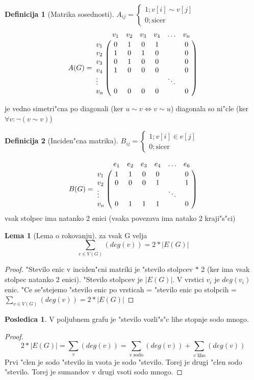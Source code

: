 \documentclass{article}
\let\bbordermatrix\bordermatrix
\theoremstyle{definition}
\newtheorem{definition}{Definicija}[section]
\newtheorem{lemma}{Lema}[section]
\newtheorem{conseq}{Posledica}[section]
\begin{document}
	\begin{definition}[Matrika sosednosti]
	$A_{ij} = \begin{cases}1; v[i] \sim v[j] \\ 0; \text{sicer} \end{cases}$
	$$
		A(G) =
		\bbordermatrix{
			    & v_1 & v_2 & v_3 & v_4 &\ldots& v_n \cr
			v_1 &  0  &  1  &  0  &  1  &      &  0  \cr
			v_2 &  1  &  0  &  1  &  0  &      &  0  \cr
			v_3 &  0  &  1  &  0  &  0  &      &  0  \cr
			v_4 &  1  &  0  &  0  &  0  &      &  0  \cr
		 \vdots &     &     &     &     &\ddots&     \cr
			v_n &  0  &  0  &  0  &  0  &      &  0  \cr
		}
	$$
	\end{definition}
	je vedno simetri"cna po diagonali (ker $u \sim v \iff v \sim u$)
	diagonala so ni"cle (ker $\forall v: \lnot(v \sim v)$)
	
	
	\begin{definition}[Inciden"cna matrika] 
		$B_{ij} = \begin{cases}1; v[i] \in e[j] \\ 0; \text{sicer} \end{cases}$
		
		$$
			B(G) =
			\bbordermatrix{
			    & e_1 & e_2 & e_3 & e_4 &\ldots& e_6 \cr 
			v_1 &  1  &  1  &  0  &  0  &      &  0 \cr 
			v_2 &  0  &  0  &  0  &  1  &      &  1 \cr
		 \vdots &     &     &     &     &\ddots&    \cr
			v_n &  0  &  1  &  1  &  1  &      &  0 \cr
			}
		$$
		vsak stolpec ima natanko 2 enici (vsaka povezava ima natako 2 kraji"s"ci)
	\end{definition}
	
	\begin{lemma}[Lema o rokovanju]
		za vsak G velja
		\[ \sum_{v \in V(G)} (deg(v)) = 2*|E(G)| \]
		\begin{proof}
			"Stevilo enic v inciden"cni matriki je "stevilo stolpcev $*$ 2 (ker ima vsak stolpec natanko 2 enici). "Stevilo stolpcev je $|E(G)|$.
			V vrstici $v_i$ je $deg(v_i)$ enic. "Ce se"stejemo "stevilo enic po vrsticah = "stevilo enic po stolpcih = $\sum_{v \in V(G)}(deg(v)) = 2*|E(G)|$
		\end{proof}
	\end{lemma}
	
	\begin{conseq} 
		V poljubnem grafu je "stevilo vozli"s"c lihe stopnje sodo mnogo. 
		\begin{proof}
			\[ 2*|E(G)| = \sum_{v}(deg(v)) = \sum_{v \text{ sodo}}(deg(v)) + \sum_{v \text{ liho}}(deg(v)) \] 
			Prvi "clen je sodo "stevilo in vsota je sodo "stevilo. Torej je drugi "clen sodo "stevilo. Torej je sumandov v drugi vsoti sodo mnogo.
		\end{proof}
	\end{conseq}
	
\end{document}
